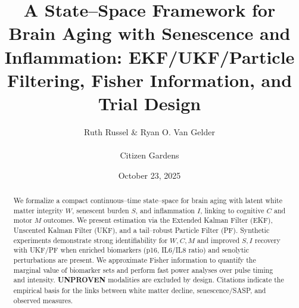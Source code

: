 \documentclass[11pt]{article}
\title{A State--Space Framework for Brain Aging with Senescence and Inflammation: EKF/UKF/Particle Filtering, Fisher Information, and Trial Design}
\author{Ruth Russel \& Ryan O. Van Gelder\\ \\ Citizen Gardens}
\date{October 23, 2025}
\begin{document}
\maketitle

\begin{abstract}
We formalize a compact continuous--time state--space for brain aging with latent white matter integrity \(W\), senescent burden \(S\), and inflammation \(I\), linking to cognitive \(C\) and motor \(M\) outcomes. We present estimation via the Extended Kalman Filter (EKF), Unscented Kalman Filter (UKF), and a tail--robust Particle Filter (PF). Synthetic experiments demonstrate strong identifiability for \(W,C,M\) and improved \(S,I\) recovery with UKF/PF when enriched biomarkers (p16, IL6/IL8 ratio) and senolytic perturbations are present. We approximate Fisher information to quantify the marginal value of biomarker sets and perform fast power analyses over pulse timing and intensity. \textbf{UNPROVEN} modalities are excluded by design. Citations indicate the empirical basis for the links between white matter decline, senescence/SASP, and observed measures.
\end{abstract}
\end{document}
